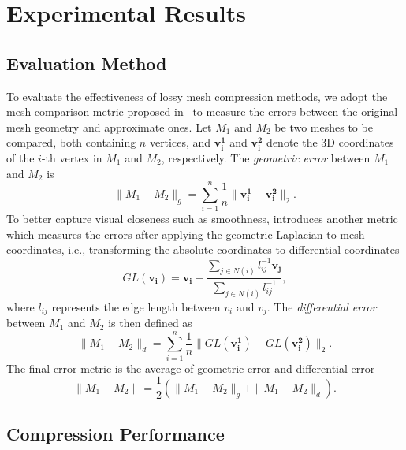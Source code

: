 \section{Experimental Results}

\subsection{Evaluation Method}

To evaluate the effectiveness of lossy mesh compression methods, we
adopt the mesh comparison metric proposed
in~\cite{Karni2000} to measure the errors between the
original mesh geometry and approximate ones. Let $M_1$ and $M_2$ be
two meshes to be compared, both containing $n$ vertices, and
$\mathbf{v^1_i}$ and $\mathbf{v^2_i}$ denote the 3D coordinates of the
$i$-th vertex in $M_1$ and $M_2$, respectively. The \emph{geometric
  error} between $M_1$ and $M_2$ is
\begin{equation}
  \|M_1-M_2\|_g = \sum_{i=1}^n \frac{1}{n}\|{\mathbf{v^1_i}-\mathbf{v^2_i}}\|_2.
\end{equation}
To better capture visual closeness such as smoothness,
\cite{Karni2000} introduces another metric which measures
the errors after applying the geometric Laplacian to mesh coordinates,
i.e., transforming the absolute coordinates to differential coordinates
\begin{equation}
  GL(\mathbf{v_i})=\mathbf{v_i}-\frac{\sum_{j\in N(i)}l_{ij}^{-1}\mathbf{v_j}}{\sum_{j\in N(i)}l_{ij}^{-1}},
\end{equation}
where $l_{ij}$ represents the edge length between $v_i$ and $v_j$. The
\emph{differential error} between $M_1$ and $M_2$ is then defined as
\begin{equation}
  \|M_1-M_2\|_d=\sum_{i=1}^n \frac{1}{n}\|GL(\mathbf{v^1_i})-GL(\mathbf{v^2_i})\|_2.
\end{equation}
The final error metric is the average of geometric error and
differential error
\begin{equation}
\|M_1-M_2\|=\frac{1}{2}(\|M_1-M_2\|_g + \|M_1-M_2\|_d).
\label{eq:metric}
\end{equation}

\subsection{Compression Performance}

